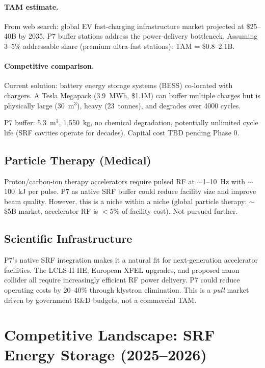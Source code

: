 \documentclass[11pt]{article}
\begin{document}
\paragraph{TAM estimate.}
From web search: global EV fast-charging infrastructure market
projected at \$25--40B by 2035. P7 buffer stations address the
power-delivery bottleneck. Assuming 3--5\% addressable share
(premium ultra-fast stations): TAM = \$0.8--2.1B.

\paragraph{Competitive comparison.}
Current solution: battery energy storage systems (BESS) co-located
with chargers. A Tesla Megapack (3.9~MWh, \$1.1M) can buffer multiple
charges but is physically large (30~m$^3$), heavy (23~tonnes),
and degrades over 4000 cycles.

P7 buffer: 5.3~m$^3$, 1,550~kg, no chemical degradation, potentially
unlimited cycle life (SRF cavities operate for decades). Capital cost
TBD pending Phase 0.

\subsection{Particle Therapy (Medical)}\label{sec:medical}

Proton/carbon-ion therapy accelerators require pulsed RF at
$\sim$1--10~Hz with $\sim$100~kJ per pulse. P7 as native SRF buffer
could reduce facility size and improve beam quality. However, this
is a niche within a niche (global particle therapy: $\sim$\$5B market,
accelerator RF is $<$5\% of facility cost). Not pursued further.

\subsection{Scientific Infrastructure}

P7's native SRF integration makes it a natural fit for next-generation
accelerator facilities. The LCLS-II-HE, European XFEL upgrades, and
proposed muon collider all require increasingly efficient RF power
delivery. P7 could reduce operating costs by 20--40\% through
klystron elimination. This is a \emph{pull} market driven by
government R\&D budgets, not a commercial TAM.

\section{Competitive Landscape: SRF Energy Storage (2025--2026)}\label{sec:competition}
\end{document}

